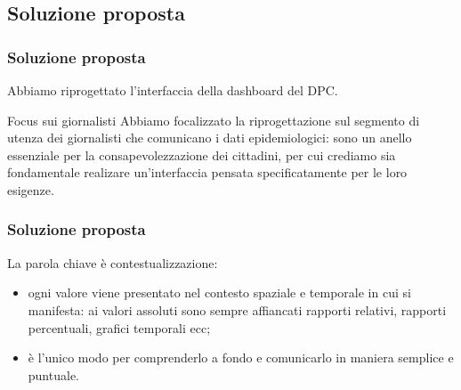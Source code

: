\documentclass[../../main.tex]{subfiles}
\begin{document}
\subsection{Soluzione proposta}

\begin{frame}
    \frametitle{Soluzione proposta}
    Abbiamo riprogettato l'interfaccia della dashboard del DPC.

    \vspace{-40pt}
    \begin{block}{Focus sui giornalisti}
        Abbiamo focalizzato la riprogettazione sul segmento di utenza dei giornalisti che comunicano i dati epidemiologici: sono un anello essenziale per la consapevolezzazione dei cittadini, per cui crediamo sia fondamentale realizare un'interfaccia pensata specificatamente per le loro esigenze.
    \end{block}

\end{frame}

\begin{frame}
    \frametitle{Soluzione proposta}
    
    La parola chiave è \alert{contestualizzazione}:
    \begin{itemize}
        \item ogni valore viene presentato nel contesto spaziale e temporale in cui si manifesta: ai valori assoluti sono sempre affiancati rapporti relativi, rapporti percentuali, grafici temporali ecc;
        \item è l'unico modo per comprenderlo a fondo e comunicarlo in maniera semplice e puntuale.
    \end{itemize}
    

\end{frame}
\end{document}
